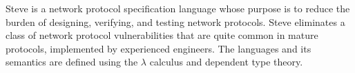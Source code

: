 Steve is a network protocol specification language whose purpose
is to reduce the burden of designing, verifying, and testing
network protocols. Steve eliminates a class of network protocol
vulnerabilities that are quite common in mature protocols, implemented
by experienced engineers. The languages and its semantics are 
defined using the $\lambda$ calculus and dependent type theory.
